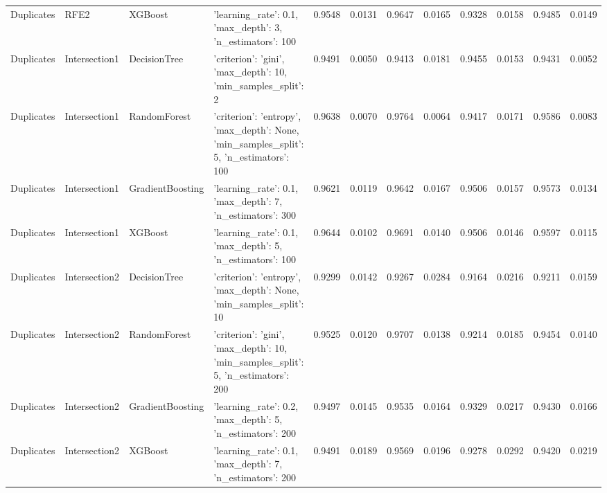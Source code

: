 \begin{tabular}{llllrrrrrrrr}
Duplicates & RFE2 & XGBoost & {'learning_rate': 0.1, 'max_depth': 3, 'n_estimators': 100} & 0.9548 & 0.0131 & 0.9647 & 0.0165 & 0.9328 & 0.0158 & 0.9485 & 0.0149 \\
Duplicates & Intersection1 & DecisionTree & {'criterion': 'gini', 'max_depth': 10, 'min_samples_split': 2} & 0.9491 & 0.0050 & 0.9413 & 0.0181 & 0.9455 & 0.0153 & 0.9431 & 0.0052 \\
Duplicates & Intersection1 & RandomForest & {'criterion': 'entropy', 'max_depth': None, 'min_samples_split': 5, 'n_estimators': 100} & 0.9638 & 0.0070 & 0.9764 & 0.0064 & 0.9417 & 0.0171 & 0.9586 & 0.0083 \\
Duplicates & Intersection1 & GradientBoosting & {'learning_rate': 0.1, 'max_depth': 7, 'n_estimators': 300} & 0.9621 & 0.0119 & 0.9642 & 0.0167 & 0.9506 & 0.0157 & 0.9573 & 0.0134 \\
Duplicates & Intersection1 & XGBoost & {'learning_rate': 0.1, 'max_depth': 5, 'n_estimators': 100} & 0.9644 & 0.0102 & 0.9691 & 0.0140 & 0.9506 & 0.0146 & 0.9597 & 0.0115 \\
Duplicates & Intersection2 & DecisionTree & {'criterion': 'entropy', 'max_depth': None, 'min_samples_split': 10} & 0.9299 & 0.0142 & 0.9267 & 0.0284 & 0.9164 & 0.0216 & 0.9211 & 0.0159 \\
Duplicates & Intersection2 & RandomForest & {'criterion': 'gini', 'max_depth': 10, 'min_samples_split': 5, 'n_estimators': 200} & 0.9525 & 0.0120 & 0.9707 & 0.0138 & 0.9214 & 0.0185 & 0.9454 & 0.0140 \\
Duplicates & Intersection2 & GradientBoosting & {'learning_rate': 0.2, 'max_depth': 5, 'n_estimators': 200} & 0.9497 & 0.0145 & 0.9535 & 0.0164 & 0.9329 & 0.0217 & 0.9430 & 0.0166 \\
Duplicates & Intersection2 & XGBoost & {'learning_rate': 0.1, 'max_depth': 7, 'n_estimators': 200} & 0.9491 & 0.0189 & 0.9569 & 0.0196 & 0.9278 & 0.0292 & 0.9420 & 0.0219 \\
\bottomrule
\end{tabular}
